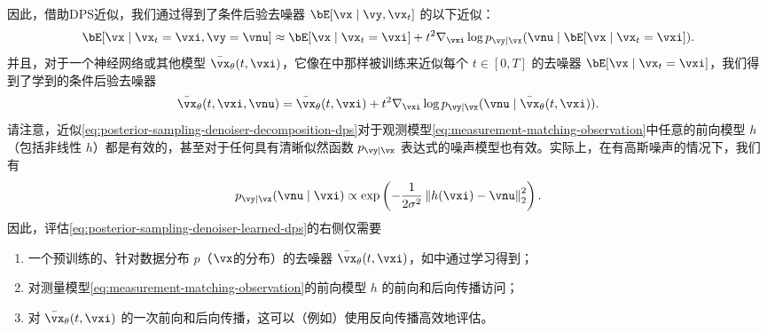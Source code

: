 \documentclass[../../book-main_zh.tex]{subfiles}
\begin{document}
因此，借助DPS近似，我们通过得到了条件后验去噪器 $\bE[\vx \mid \vy, \vx_t]$ 的以下近似：
\begin{equation}
  \bE[ \vx \mid \vx_t=\vxi, \vy=\vnu]
  \approx
  \bE[\vx \mid \vx_t=\vxi] 
  + t^2 \nabla_{\vxi} \log p_{\vy \mid \vx}(\vnu \mid \bE[\vx \mid \vx_t = \vxi]).
  \label{eq:posterior-sampling-denoiser-decomposition-dps}
\end{equation}
并且，对于一个神经网络或其他模型 $\bar{\vx}_{\theta}(t, \vxi)$，它像在中那样被训练来近似每个 $t \in [0, T]$ 的去噪器 $\bE[\vx \mid \vx_t = \vxi]$，我们得到了学到的条件后验去噪器
\begin{equation}
  \bar{\vx}_{\theta}(t, \vxi, \vnu) 
  = \bar{\vx}_{\theta}(t, \vxi)
  + t^2 \nabla_{\vxi} \log p_{\vy \mid \vx}(\vnu \mid \bar{\vx}_{\theta}(t,
  \vxi)).
  \label{eq:posterior-sampling-denoiser-learned-dps}
\end{equation}
请注意，近似\eqref{eq:posterior-sampling-denoiser-decomposition-dps}对于观测模型\eqref{eq:measurement-matching-observation}中任意的前向模型 $h$（包括非线性 $h$）都是有效的，甚至对于任何具有清晰似然函数 $p_{\vy \mid \vx}$ 表达式的噪声模型也有效。实际上，在有高斯噪声的情况下，我们有
\begin{equation}
  p_{\vy \mid \vx}(\vnu \mid \vxi)
  \propto
  \exp\left(
    -\frac{1}{2\sigma^2} \norm*{ h(\vxi) - \vnu }_2^2
  \right).
\end{equation}
因此，评估\eqref{eq:posterior-sampling-denoiser-learned-dps}的右侧仅需要
\begin{enumerate}
  \item 一个预训练的、针对数据分布 $p$（$\vx$的分布）的去噪器 $\bar{\vx}_{\theta}(t, \vxi)$，如中通过学习得到；
  \item 对测量模型\eqref{eq:measurement-matching-observation}的前向模型 $h$ 的前向和后向传播访问；
  \item 对 $\bar{\vx}_{\theta}(t, \vxi)$ 的一次前向和后向传播，这可以（例如）使用反向传播高效地评估。
\end{enumerate}
\end{document}
